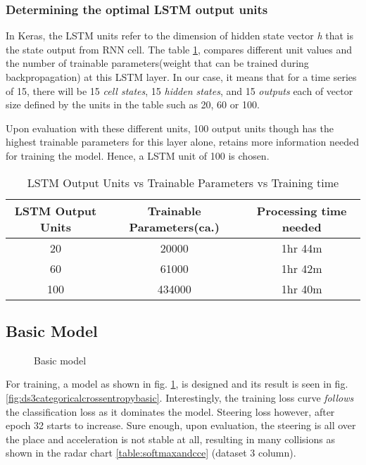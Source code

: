 \subsubsection*{Determining the optimal LSTM output units}
In Keras, the LSTM units refer to the dimension of hidden state vector \textit{h} that is the state output from RNN cell.
The table \ref{table:unitsvstime}, compares different unit values and the number of
trainable parameters(weight that can be trained during backpropagation) at this LSTM
layer.
In our case, it means that for a time series of 15, there will be 15 \textit{cell states},
15 \textit{hidden states}, and 15 \textit{outputs} each of vector size defined by the
units in the table such as 20, 60 or 100.

Upon evaluation with these different units, 100 output units though has the highest
trainable parameters for this layer alone, retains more information needed for training
the model.  Hence, a LSTM unit of 100 is chosen.
\begin{table}[t]
    \centering
\begin{tabular}{ccc}
    \toprule
    LSTM Output Units & Trainable Parameters(ca.) & Processing time needed \\\midrule
    20 & 20000 & 1hr 44m  \\
    60 & 61000 & 1hr 42m \\
    100 & 434000  & 1hr 40m \\\bottomrule
\end{tabular}
\caption{LSTM Output Units vs Trainable Parameters vs Training time}
\label{table:unitsvstime}
\end{table}
\subsection{Basic Model}
\begin{figure}[!ht]
    \centering
    \def\svgwidth{0.2\textwidth}
    \caption{Basic model}
    \label{fig:steeringbasicmodel}
\end{figure}

For training, a model as shown in fig. \ref{fig:steeringbasicmodel}, is designed and its
result is seen in fig. \ref{fig:ds3categoricalcrossentropybasic}. Interestingly, the
training loss curve \textit{follows} the classification loss as it dominates the model. Steering
loss however, after epoch 32 starts to increase. Sure enough, upon evaluation,
the steering is all over the place and acceleration is not stable at all, resulting in
many collisions as shown in the radar chart \ref{table:softmaxandcce} (dataset 3 column).

